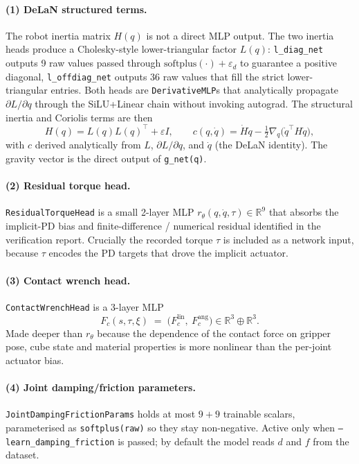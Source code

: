 \documentclass[11pt]{article}
\begin{document}
\paragraph{(1) DeLaN structured terms.}
The robot inertia matrix $H(q)$ is not a direct MLP output. The two
inertia heads produce a Cholesky-style lower-triangular factor $L(q)$:
\texttt{l\_diag\_net} outputs 9 raw values passed through
$\mathrm{softplus}(\cdot)+\varepsilon_d$ to guarantee a positive diagonal,
\texttt{l\_offdiag\_net} outputs 36 raw values that fill the strict
lower-triangular entries. Both heads are \texttt{DerivativeMLP}s that
analytically propagate $\partial L/\partial q$ through the SiLU+Linear
chain without invoking autograd. The structural inertia and Coriolis terms
are then
\begin{equation}
  H(q) = L(q)L(q)^\top + \varepsilon I,
  \qquad
  c(q,\dot q) = \dot H \dot q - \tfrac{1}{2}\nabla_q\bigl(\dot q^\top H \dot q\bigr),
\end{equation}
with $c$ derived analytically from $L$, $\partial L/\partial q$, and
$\dot q$ (the DeLaN identity). The gravity vector is the direct output of
\texttt{g\_net(q)}.

\paragraph{(2) Residual torque head.}
\texttt{ResidualTorqueHead} is a small 2-layer MLP
\(r_\theta(q,\dot q,\tau) \in \mathbb{R}^9\)
that absorbs the implicit-PD bias and finite-difference / numerical residual
identified in the verification report.  Crucially the recorded torque
$\tau$ is included as a network input, because $\tau$ encodes the PD targets
that drove the implicit actuator.

\paragraph{(3) Contact wrench head.}
\texttt{ContactWrenchHead} is a 3-layer MLP
\begin{equation}
  F_c(s,\tau,\xi)
  \;=\;\bigl(F_c^{\mathrm{lin}},\ F_c^{\mathrm{ang}}\bigr) \in \mathbb{R}^{3}\!\oplus\mathbb{R}^{3}.
\end{equation}
Made deeper than $r_\theta$ because the dependence of the contact force on
gripper pose, cube state and material properties is more nonlinear than the
per-joint actuator bias.

\paragraph{(4) Joint damping/friction parameters.}
\texttt{JointDampingFrictionParams} holds at most $9 + 9$ trainable
scalars, parameterised as \texttt{softplus(raw)} so they stay non-negative.
Active only when \texttt{--learn\_damping\_friction} is passed; by default
the model reads $d$ and $f$ from the dataset.
\end{document}
